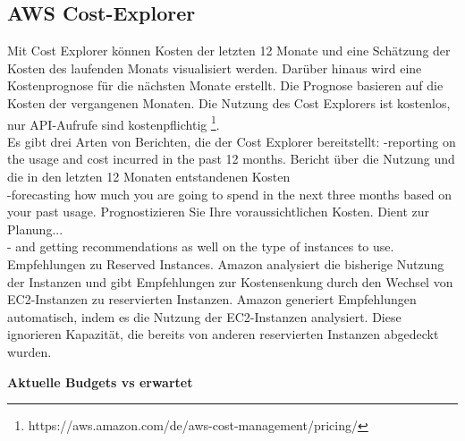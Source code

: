 \subsection{AWS Cost-Explorer}
Mit Cost Explorer können Kosten der letzten 12 Monate und eine Schätzung der Kosten des laufenden Monats visualisiert werden. Darüber hinaus wird eine Kostenprognose für die nächsten Monate erstellt. Die Prognose basieren auf die Kosten der vergangenen Monaten.
Die Nutzung des Cost Explorers ist kostenlos, nur API-Aufrufe sind kostenpflichtig \footnote{https://aws.amazon.com/de/aws-cost-management/pricing/}.
\\
Es gibt drei Arten von Berichten, die der Cost Explorer bereitstellt:
-reporting on the usage and cost incurred in the past 12 months.
Bericht über die Nutzung und die in den letzten 12 Monaten entstandenen Kosten
\\
-forecasting how much you are going to spend in the next three months based on your past usage.
Prognostizieren Sie Ihre voraussichtlichen Kosten.
Dient zur Planung...
\\
- and getting recommendations as well on the type of instances to use.
Empfehlungen zu Reserved Instances.
Amazon analysiert die bisherige Nutzung der Instanzen und gibt Empfehlungen zur Kostensenkung durch den Wechsel von EC2-Instanzen zu reservierten Instanzen.
Amazon generiert Empfehlungen automatisch, indem es die Nutzung der EC2-Instanzen analysiert.
Diese ignorieren Kapazität, die bereits von anderen reservierten Instanzen abgedeckt wurden.

\textbf{Aktuelle Budgets vs erwartet}
\begin{comment}
AWS Cost Explorer Budgets show actual spend vs budget by month.
Filter by budgets, tags and tax, region, instances, usage type, cost category
Die Kosten vorhersehbar machen
Wiederverwendung gespeicherter Berichte. Welche Vorteile?

Da kann man sehen wie viele Stunden an RI und an On-Demand pro Tag/Monat verbraucht wurden.
-	Informationen um Schätzungen handelt, die von den tatsächlichen Kosten für den Abrechnungszeitraum abweichen können. %
-	Kann ich die Usage von S3 Einheiten und analysieren, wie häufig diese zugegriffen werden %
-	Man könnte herausfinden, ob die RIs tatsächlich günstiger als ON-Demand sind. Wenn die RIs sind „konvertierbar“ und teurer als On-Demand, könnte man sich dafür entscheiden diese in was umzuwandeln, was genutzt wird. %

\end{comment}
